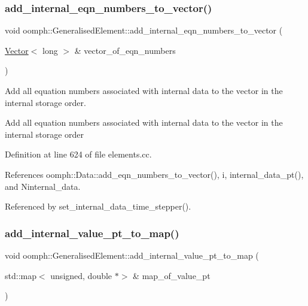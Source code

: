 \subsubsection{\texorpdfstring{add\+\_\+internal\+\_\+eqn\+\_\+numbers\+\_\+to\+\_\+vector()}{add\_internal\_eqn\_numbers\_to\_vector()}}
{\footnotesize\ttfamily void oomph\+::\+Generalised\+Element\+::add\+\_\+internal\+\_\+eqn\+\_\+numbers\+\_\+to\+\_\+vector (\begin{DoxyParamCaption}\item[{\hyperlink{classoomph_1_1Vector}{Vector}$<$ long $>$ \&}]{vector\+\_\+of\+\_\+eqn\+\_\+numbers }\end{DoxyParamCaption})}



Add all equation numbers associated with internal data to the vector in the internal storage order. 

Add all equation numbers associated with internal data to the vector in the internal storage order 

Definition at line 624 of file elements.\+cc.



References oomph\+::\+Data\+::add\+\_\+eqn\+\_\+numbers\+\_\+to\+\_\+vector(), i, internal\+\_\+data\+\_\+pt(), and Ninternal\+\_\+data.



Referenced by set\+\_\+internal\+\_\+data\+\_\+time\+\_\+stepper().

\mbox{\label{classoomph_1_1GeneralisedElement_a21176c64836cffa50accdeb494a31d72}} 
\subsubsection{\texorpdfstring{add\+\_\+internal\+\_\+value\+\_\+pt\+\_\+to\+\_\+map()}{add\_internal\_value\_pt\_to\_map()}}
{\footnotesize\ttfamily void oomph\+::\+Generalised\+Element\+::add\+\_\+internal\+\_\+value\+\_\+pt\+\_\+to\+\_\+map (\begin{DoxyParamCaption}\item[{std\+::map$<$ unsigned, double $\ast$$>$ \&}]{map\+\_\+of\+\_\+value\+\_\+pt }\end{DoxyParamCaption})}



